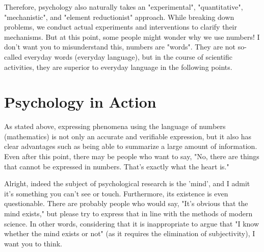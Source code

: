 \documentclass{ltjsbook}
\begin{document}
Therefore, psychology also naturally takes an "experimental", "quantitative", "mechanistic", and "element reductionist" approach. While breaking down problems, we conduct actual experiments and interventions to clarify their mechanisms. But at this point, some people might wonder why we use numbers! I don't want you to misunderstand this, numbers are "words". They are not so-called everyday words (everyday language), but in the course of scientific activities, they are superior to everyday language in the following points.



\section{Psychology in Action}

As stated above, expressing phenomena using the language of numbers (mathematics) is not only an accurate and verifiable expression, but it also has clear advantages such as being able to summarize a large amount of information. Even after this point, there may be people who want to say, "No, there are things that cannot be expressed in numbers. That's exactly what the heart is."

Alright, indeed the subject of psychological research is the 'mind', and I admit it's something you can't see or touch. Furthermore, its existence is even questionable. There are probably people who would say, "It's obvious that the mind exists," but please try to express that in line with the methods of modern science. In other words, considering that it is inappropriate to argue that "I know whether the mind exists or not" (as it requires the elimination of subjectivity), I want you to think.
\end{document}
